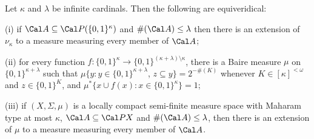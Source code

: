  Let $\kappa$ and $\lambda$ be infinite
cardinals.   Then the following are equiveridical:

(i) if $\Cal A\subseteq\Cal P(\{0,1\}^{\kappa})$ and
$\#(\Cal A)\le\lambda$ then there is an extension of
$\nu_{\kappa}$ to a measure measuring every member of $\Cal A$;

(ii) for every function
$f:\{0,1\}^{\kappa}\to\{0,1\}^{(\kappa+\lambda)\setminus\kappa}$,
there is a Baire measure $\mu$ on $\{0,1\}^{\kappa+\lambda}$ such that
$\mu\{y:y\in\{0,1\}^{\kappa+\lambda}$, $z\subseteq y\}=2^{-\#(K)}$
whenever $K\in[\kappa]^{<\omega}$ and $z\in\{0,1\}^K$, and
$\mu^*\{x\cup f(x):x\in\{0,1\}^{\kappa}\}=1$;

(iii) if $(X,\Sigma,\mu)$ is a locally compact semi-finite measure space with Maharam type at most $\kappa$,
$\Cal A\subseteq\Cal PX$ and $\#(\Cal A)\le\lambda$, then there is an
extension of $\mu$ to a measure measuring every member of $\Cal A$.

